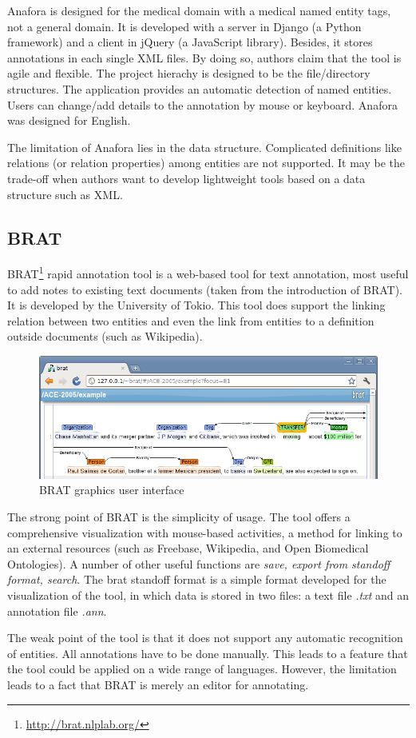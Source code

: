 Anafora is designed for the medical domain with a medical named entity tags, not a general domain.
It is developed with a server in Django (a Python framework) and a client in jQuery (a JavaScript library).
Besides, it stores annotations in each single XML files.
By doing so, authors claim that the tool is agile and flexible.
The project hierachy is designed to be the file/directory structures.
The application provides an automatic detection of named entities.
Users can change/add details to the annotation by mouse or keyboard.
Anafora was designed for English.

The limitation of Anafora lies in the data structure.
Complicated definitions like relations (or relation properties) among entities
are not supported. It may be the trade-off when authors want to develop lightweight
tools based on a data structure such as XML.

\subsection{BRAT}

BRAT\footnote{\url{http://brat.nlplab.org/}} rapid annotation tool is a web-based tool for text annotation,
most useful to add notes to existing text documents (taken from the introduction of BRAT).
It is developed by the University of Tokio.
This tool does support the linking relation between two entities and even the link from entities to a definition outside documents (such as Wikipedia).

\begin{figure}[!htb]
	\centering
	\includegraphics[width=\textwidth]{Images/brat}
	\caption{BRAT graphics user interface}
	\label{fig:Second}
\end{figure}

The strong point of BRAT is the simplicity of usage.
The tool offers a comprehensive visualization with mouse-based activities,
a method for linking to an external resources (such as Freebase, Wikipedia, and Open Biomedical Ontologies).
A number of other useful functions are \textit{save, export from standoff format, search}.
The brat  standoff format is a simple format developed for the visualization of the tool,
in which data is stored in two files: a text file \textit{.txt} and an annotation file \textit{.ann}.

The weak point of the tool is that it does not support any automatic recognition of entities.
All annotations have to be done manually.
This leads to a feature that the tool could be applied on a wide range of languages.
However, the limitation leads to a fact that BRAT is merely an editor for annotating.
